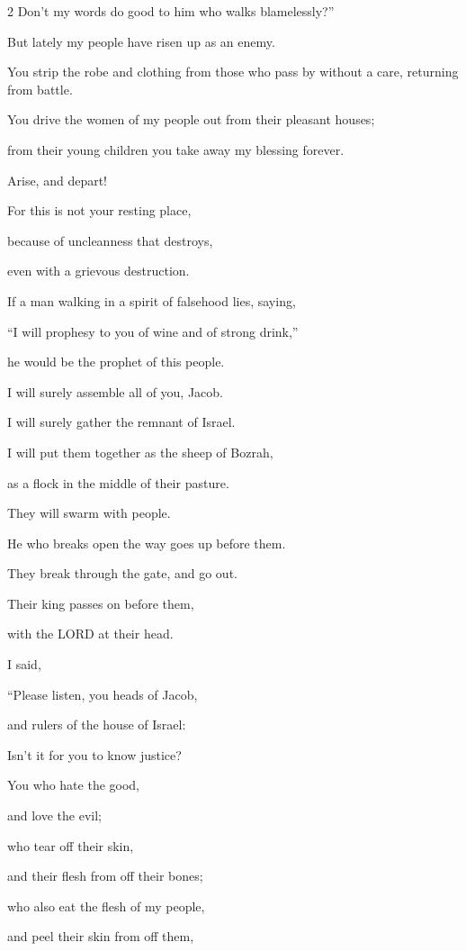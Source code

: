 \begin{multicols}{2}
Don’t my words do good to him who walks blamelessly?”

\myverse{}But lately my people have risen up as an enemy.

You strip the robe and clothing from those who pass by without a care, returning
from battle.

\myverse{}You drive the women of my people out from their pleasant houses;

from their young children you take away my blessing forever.

\myverse{}Arise, and depart!

For this is not your resting place,

because of uncleanness that destroys,

even with a grievous destruction.

\myverse{}If a man walking in a spirit of falsehood lies, saying,

“I will prophesy to you of wine and of strong drink,”

he would be the prophet of this people.

\myverse{}I will surely assemble all of you, Jacob.

I will surely gather the remnant of Israel.

I will put them together as the sheep of Bozrah,

as a flock in the middle of their pasture.

They will swarm with people.

\myverse{}He who breaks open the way goes up before them.

They break through the gate, and go out.

Their king passes on before them,

with the LORD at their head.


\mychapter{} \myverse*{}I said,

“Please listen, you heads of Jacob,

and rulers of the house of Israel:

Isn’t it for you to know justice?

\myverse{}You who hate the good,

and love the evil;

who tear off their skin,

and their flesh from off their bones;

\myverse{}who also eat the flesh of my people,

and peel their skin from off them,


\end{multicols}
